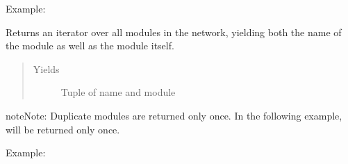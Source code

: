 \documentclass[letterpaper,10pt,english]{sphinxmanual}
\begin{document}
\begin{fulllineitems}
\begin{fulllineitems}
\begin{quote}
\begin{description}
\end{description}\end{quote}

Example:

\begin{sphinxVerbatim}[commandchars=\\\{\}]
    
       \PYG{p}{[} \PYG{p}{]}
        
\end{sphinxVerbatim}

\end{fulllineitems}


\begin{fulllineitems}
\label{\detokenize{api/dynamics:geology.metamodelling.dynamics.NeuralDifferentialEquation.named_modules}}
Returns an iterator over all modules in the network, yielding
both the name of the module as well as the module itself.
\begin{quote}\begin{description}
\item[{Yields}] \leavevmode
{} \textendash{} Tuple of name and module

\end{description}\end{quote}

\begin{sphinxadmonition}{note}{Note:}
Duplicate modules are returned only once. In the following
example,  will be returned only once.
\end{sphinxadmonition}

Example:


\end{fulllineitems}
\end{fulllineitems}
\end{document}
